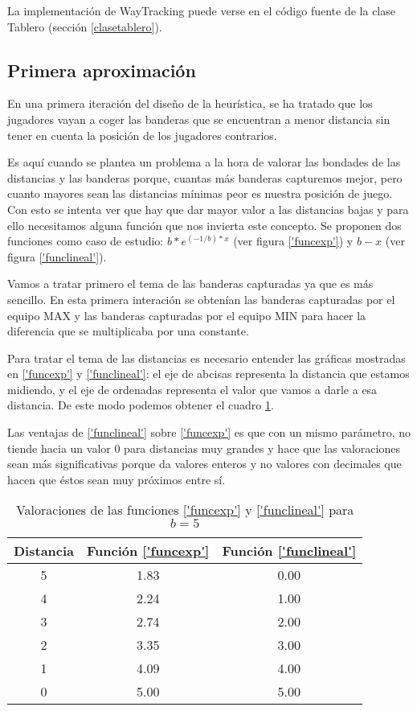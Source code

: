 La implementación de WayTracking puede verse en el código fuente de la
clase Tablero (sección \ref{clasetablero}).

\subsection {Primera aproximación}
\label{sec:distancias}
En una primera iteración del diseño de la heurística, se ha tratado
que los jugadores vayan a coger las banderas que se encuentran a menor
distancia sin tener en cuenta la posición de los jugadores contrarios.



Es aquí cuando se plantea un problema a la hora de valorar las
bondades de las distancias y las banderas porque, cuantas más banderas
capturemos mejor, pero cuanto mayores sean las distancias mínimas peor
es nuestra posición de juego. Con esto se intenta ver que hay que dar
mayor valor a las distancias bajas y para ello necesitamos alguna
función que nos invierta este concepto. Se proponen dos funciones como
caso de estudio: $b*e^{(-1/b)*x}$ (ver figura \ref{'funcexp'}) y $b-x$
(ver figura \ref{'funclineal'}).

Vamos a tratar primero el tema de las banderas capturadas ya que es
más sencillo. En esta primera interación se obtenían las banderas
capturadas por el equipo MAX y las banderas capturadas por el equipo
MIN para hacer la diferencia que se multiplicaba por una constante.

Para tratar el tema de las distancias es necesario entender las
gráficas mostradas en \ref{'funcexp'} y \ref{'funclineal'}: el eje de
abcisas representa la distancia que estamos midiendo, y el eje de
ordenadas representa el valor que vamos a darle a esa distancia. De
este modo podemos obtener el cuadro \ref{tab:valoraciones}.

Las ventajas de \ref{'funclineal'} sobre \ref{'funcexp'} es que con
un mismo parámetro, no tiende hacia un valor 0 para distancias muy
grandes y hace que las valoraciones sean más significativas porque da
valores enteros y no valores con decimales que hacen que éstos sean
muy próximos entre sí.

\begin{table}[h!]
  \centering
  \begin{tabular}[h!]{|c|c|c|}
    \hline
    \textbf{Distancia} & \textbf{Función \ref{'funcexp'}} & \textbf{Función
    \ref{'funclineal'}} \\ \hline
    5 & 1.83 & 0.00 \\ \hline
    4 & 2.24 & 1.00 \\ \hline
    3 & 2.74 & 2.00 \\ \hline
    2 & 3.35 & 3.00 \\ \hline
    1 & 4.09 & 4.00 \\ \hline
    0 & 5.00 & 5.00 \\ \hline
  \end{tabular}
  \caption{Valoraciones de las funciones \ref{'funcexp'} y
    \ref{'funclineal'} para $b=5$}
  \label{tab:valoraciones}
\end{table}

